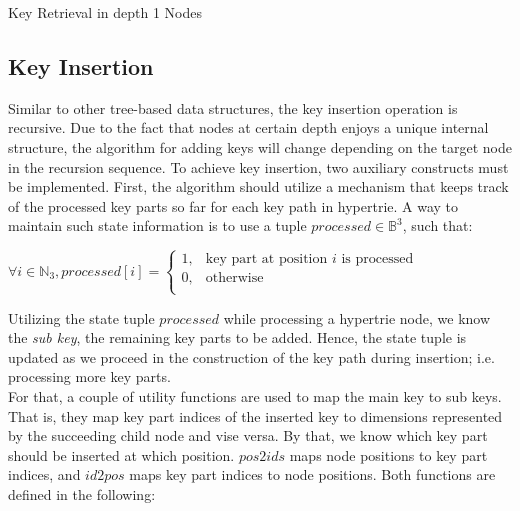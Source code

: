 \begin{algorithm}
	\DontPrintSemicolon
	\SetAlgoLined
	 \;
	\caption{\sc Key Retrieval in depth 1 Nodes}
	\label{algo:key_retrieval_depth1}
	
\end{algorithm}

\clearpage

\subsection{Key Insertion} 
Similar to other tree-based data structures, the key insertion operation is recursive. Due to the fact that nodes at certain depth enjoys a unique  internal structure, the algorithm for adding keys will change depending on the target node in the recursion sequence. To achieve key insertion, two auxiliary constructs must be implemented. First, the algorithm should utilize a mechanism that keeps track of the processed key parts so far for each key path in hypertrie. A way to maintain such state information is to use a tuple $processed \in \mathbb{B}^3$, such that:\\

\centerline{$\forall i \in \mathbb{N}_3 , processed[i] = \left\{ \begin{array}{rc} 1, & \mbox{key part at position }i\mbox{ is processed} \\ 0,  & \mbox{otherwise} \\ \end{array} \right.$}

\hspace{2cm}

Utilizing the state tuple $processed$ while processing a hypertrie node, we know the \textit{sub key}, the remaining key parts to be added. Hence, the state tuple is updated as we proceed in the construction of the key path during insertion; i.e. processing more key parts. \\

 For that, a couple of utility functions are used to map the main key to sub keys. That is, they map key part indices of the inserted key to dimensions represented by the succeeding child node and vise versa. By that, we know which key part should be inserted at which position. $pos2ids$ maps node positions to key part indices, and $id2pos$ maps key part indices to node positions. Both functions are defined in the following:\\
 
